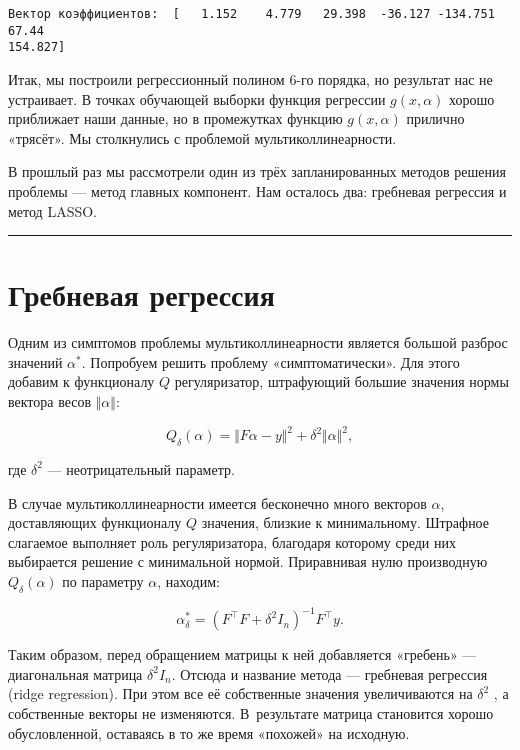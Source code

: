 \documentclass[11pt,a4paper]{article}
\renewcommand{\linethickness}{0.1ex}
\begin{document}
    \begin{Verbatim}[commandchars=\\\{\}]
Вектор коэффициентов:  [   1.152    4.779   29.398  -36.127 -134.751   67.44
154.827]
    \end{Verbatim}

    Итак, мы построили регрессионный полином 6-го порядка, но результат нас
не устраивает. В точках обучающей выборки функция регрессии
\(g(x, \alpha)\) хорошо приближает наши данные, но в промежутках функцию
\(g(x, \alpha)\) прилично «трясёт». Мы столкнулись с проблемой
мультиколлинеарности.

В прошлый раз мы рассмотрели один из трёх запланированных методов решения
проблемы --- метод главных компонент.
Нам осталось два: гребневая регрессия и метод LASSO.

    \begin{center}\rule{0.5\linewidth}{\linethickness}\end{center}

    \hypertarget{ux433ux440ux435ux431ux43dux435ux432ux430ux44f-ux440ux435ux433ux440ux435ux441ux441ux438ux44f}{%
\section{Гребневая
регрессия}\label{ux433ux440ux435ux431ux43dux435ux432ux430ux44f-ux440ux435ux433ux440ux435ux441ux441ux438ux44f}}

Одним из симптомов проблемы мультиколлинеарности является большой
разброс значений \(\alpha^*\). Попробуем решить проблему
«симптоматически». Для этого добавим к функционалу \(Q\) регуляризатор,
штрафующий большие значения нормы вектора весов \(\Vert \alpha \Vert\):

\[ Q_\delta(\alpha) = \Vert F\alpha - y \Vert^2 + \delta^2 \Vert \alpha \Vert^2, \]

где \(\delta^2\) --- неотрицательный параметр.

В случае мультиколлинеарности имеется бесконечно много векторов
\(\alpha\), доставляющих функционалу \(Q\) значения, близкие к
минимальному. Штрафное слагаемое выполняет роль регуляризатора,
благодаря которому среди них выбирается решение с минимальной нормой.
Приравнивая нулю производную \(Q_\delta (\alpha)\) по параметру
\(\alpha\), находим:

\[ \alpha_\delta^\ast = (F^\top F + \delta^2 I_n)^{-1} F^\top y. \]

Таким образом, перед обращением матрицы к ней добавляется «гребень» ---
диагональная матрица \(\delta^2 I_n\).
Отсюда и название метода --- гребневая регрессия (ridge regression).
При этом все её собственные значения увеличиваются на \(\delta^2\) , а собственные векторы не
изменяются.
В~результате матрица становится хорошо обусловленной,
оставаясь в то же время «похожей» на исходную.
\end{document}
